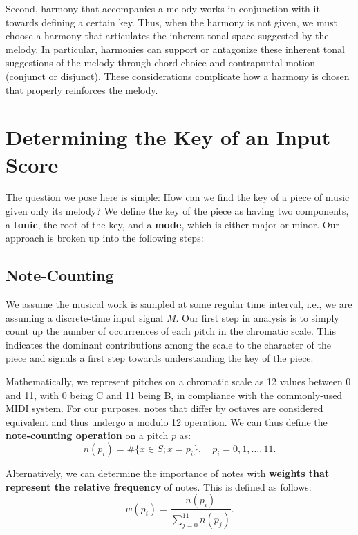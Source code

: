 \documentclass[11pt]{article}
\begin{document}
Second, harmony that accompanies a melody works in conjunction with it towards defining a certain key. Thus, when the harmony  is not given, we must choose a harmony that articulates the inherent tonal space suggested by the melody. In particular,  harmonies can support or antagonize these inherent tonal suggestions of the melody through chord choice and contrapuntal motion (conjunct or disjunct). These considerations complicate how a harmony is chosen that properly reinforces the melody.

\section{Determining the Key of an Input Score} 
The question we pose here is simple: How can we find the key of a piece of music given only its melody? We define the key of the piece as having two components, a {\bf tonic}, the root of the key, and a {\bf mode}, which is either major or minor. Our approach is broken up into the following steps:

\subsection{Note-Counting}
We assume the musical work is sampled at some regular time interval, i.e., we are assuming a discrete-time input signal $M$. Our first step in analysis is to simply count up the number of occurrences of each pitch in the chromatic scale. This indicates the dominant contributions among the scale to the character of the piece and signals a first step towards understanding the key of the piece.

Mathematically, we represent pitches on a chromatic scale as 12 values between 0 and 11, with 0 being C and 11 being B, in compliance with the commonly-used MIDI system. For our purposes, notes that differ by octaves are considered equivalent and thus undergo a modulo 12 operation. We can thus define the {\bf note-counting operation} on a pitch $p$ as:
\begin{equation}
	n(p_i) = \#\{x\in S; x = p_i\}, \quad p_i=0,1,\ldots,11.
\end{equation}

Alternatively, we can determine the importance of notes with {\bf weights that represent the relative frequency} of notes. This is defined as follows:
\begin{equation}
	w(p_i) = \frac{n(p_i)}{\sum_{j=0}^{11} n(p_j)}.
\end{equation}
\end{document}
